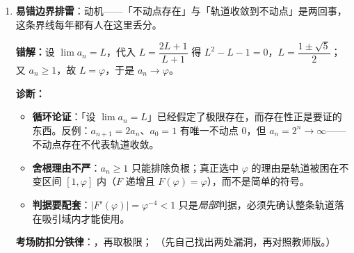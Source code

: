 \begin{tcolorbox}
\begin{enumerate}[label=(\arabic*), itemsep=4pt]
\textbf{与正文对读}：正文第 6 节的局部线性化 $F(x)\approx x^*+F'(x^*)(x-x^*)$ 是同一招的连续版；第 5 章的「共轭变换」$b_{n+1}\approx F'(x^*)b_n$ 是它的离散命名。$F'>0$ 得单调阶梯，$F'<0$ 得交错螺旋——符号决定形态，模长决定快慢。


\item \textbf{易错边界排雷}：动机——「不动点存在」与「轨道收敛到不动点」是两回事，这条界线每年都有人在这里丢分。

{\bfseries\color{red!70!black}错解：}设 $\lim a_n=L$，代入 $L=\dfrac{2L+1}{L+1}$ 得 $L^2-L-1=0$，$L=\dfrac{1\pm\sqrt5}{2}$；又 $a_n\ge1$，故 $L=\varphi$，于是 $a_n\to\varphi$。

\ifteacher
{\bfseries\color{main}诊断：}
\begin{itemize}[itemsep=1pt]
\item \textbf{循环论证}：「设 $\lim a_n=L$」已经假定了极限存在，而存在性正是要证的东西。反例：$a_{n+1}=2a_n$、$a_0=1$ 有唯一不动点 $0$，但 $a_n=2^n\to\infty$——不动点存在不代表轨道收敛。
\item \textbf{舍根理由不严}：$a_n\ge1$ 只能排除负根；真正选中 $\varphi$ 的理由是轨道被困在不变区间 $[1,\varphi]$ 内（$F$ 递增且 $F(\varphi)=\varphi$），而不是简单的符号。
\item \textbf{判据要配套}：$|F'(\varphi)|=\varphi^{-4}<1$ 只是\emph{局部}判据，必须先确认整条轨道落在吸引域内才能使用。
\end{itemize}

\textbf{考场防扣分铁律}：，再取极限；
\else
{\small（先自己找出两处漏洞，再对照教师版。）}
\fi
{}
\end{enumerate}
\end{tcolorbox}

